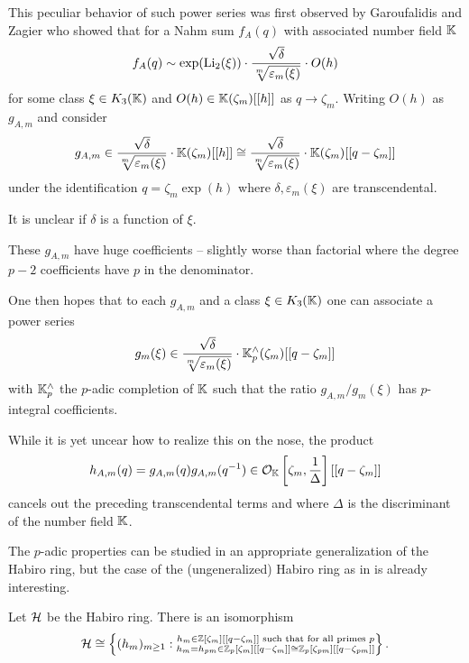 This peculiar behavior of such power series was first observed by Garoufalidis and Zagier who showed that for a Nahm sum $f_{A}(q)$ with associated number field $\mathbb{K}$
$$f_{A}(q)\sim\exp(\mathrm{Li}_{2}(\xi))\cdot\frac{\sqrt{\delta}}{\sqrt[m]{\varepsilon_{m}(\xi)}}\cdot O(h)$$
for some class $\xi\in K_{3}(\mathbb{K})$ and $O(h)\in\mathbb{K}(\zeta_{m})[[h]]$ as $q\to\zeta_{m}$. Writing $O(h)$ as $g_{A,m}$ and consider 
$$g_{A,m}\in \frac{\sqrt{\delta}}{\sqrt[m]{\varepsilon_{m}(\xi)}}\cdot\mathbb{K}(\zeta_{m})[[h]]\cong\frac{\sqrt{\delta}}{\sqrt[m]{\varepsilon_{m}(\xi)}}\cdot\mathbb{K}(\zeta_{m})[[q-\zeta_{m}]]$$
under the identification $q=\zeta_{m}\exp(h)$ where $\delta,\varepsilon_{m}(\xi)$ are transcendental. 
\begin{remark}
    It is unclear if $\delta$ is a function of $\xi$. 
\end{remark}
\begin{remark}
    These $g_{A,m}$ have huge coefficients -- slightly worse than factorial where the degree $p-2$ coefficients have $p$ in the denominator. 
\end{remark}
One then hopes that to each $g_{A,m}$ and a class $\xi\in K_{3}(\mathbb{K})$ one can associate a power series 
$$g_{m}(\xi)\in\frac{\sqrt{\delta}}{\sqrt[m]{\varepsilon_{m}(\xi)}}\cdot\mathbb{K}_{p}^{\wedge}(\zeta_{m})[[q-\zeta_{m}]]$$
with $\mathbb{K}_{p}^{\wedge}$ the $p$-adic completion of $\mathbb{K}$ such that the ratio $g_{A,m}/g_{m}(\xi)$ has $p$-integral coefficients. 

While it is yet uncear how to realize this on the nose, the product 
\begin{equation}\label{eqn: symmetrization}
    h_{A,m}(q)=g_{A,m}(q)g_{A,m}(q^{-1})\in\mathcal{O}_{\mathbb{K}}\left[\zeta_{m},\frac{1}{\Delta}\right][[q-\zeta_{m}]]
\end{equation}
cancels out the preceding transcendental terms and where $\Delta$ is the discriminant of the number field $\mathbb{K}$. 

The $p$-adic properties can be studied in an appropriate generalization of the Habiro ring, but the case of the (ungeneralized) Habiro ring as in  is already interesting. 
\begin{proposition}\label{prop: isomorphism of Habiro ring}
    Let $\mathcal{H}$ be the Habiro ring. There is an isomorphism 
    $$\mathcal{H}\cong\left\{(h_{m})_{m\geq 1}:\substack{h_{m}\in\mathbb{Z}[\zeta_{m}][[q-\zeta_{m}]] \text{ such that for all primes }p\\ h_{m}=h_{pm}\in\mathbb{Z}_{p}[\zeta_{m}][[q-\zeta_{m}]]\cong\mathbb{Z}_{p}[\zeta_{pm}][[q-\zeta_{pm}]]}\right\}.$$
\end{proposition}


